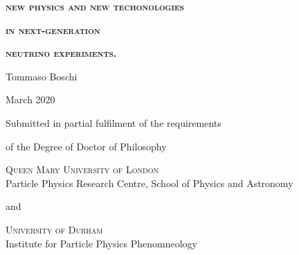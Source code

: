 
\begin{center}

	\vspace*{10em}

	\textsc{\Huge \bfseries new physics and new techonologies}

	\medskip
	\textsc{\Huge \bfseries in next-generation}

	\medskip
	\textsc{\Huge \bfseries neutrino experiments.}

	\vspace{5em}
	{\Large Tommaso Boschi}

	 March 2020

	\vfill
	Submitted in partial fulfilment of the requirements

	of the Degree of Doctor of Philosophy

	\vfill
	{\large
	\textsc{Queen Mary University of London} \\
	Particle Physics Research Centre, School of Physics and Astronomy}

	\bigskip
	and

	\bigskip
	{\large
	\textsc{University of Durham} \\ 
	Institute for Particle Physics Phenomneology}
	\vspace*{5em}

\end{center}

\restoregeometry
